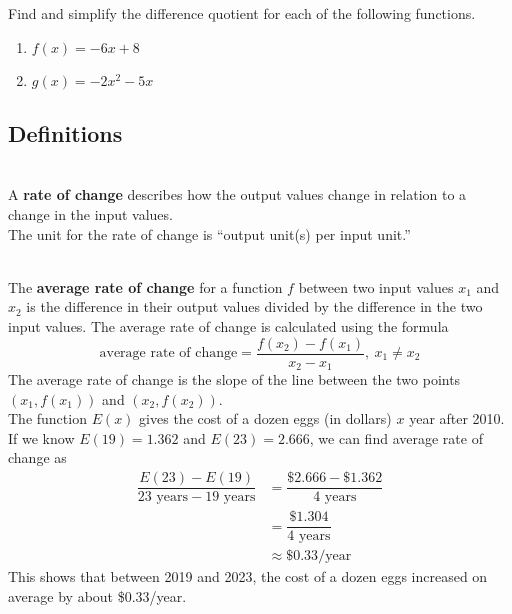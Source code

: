 



\newpage


\begin{myPractice}
Find and simplify the difference quotient for each of the following functions.
\begin{enumerate}

\item $f(x) = -6x + 8$
\vfill

\item $g(x) = -2x^2 - 5x$
\vfill


\end{enumerate}
\end{myPractice}

\newpage

\subsection*{Definitions} \label{def-difference-quotient}


\begin{myDefinition}~\\[0.5mm]
A {\bf rate of change} describes how the output values change in relation to a change in the input values.  \\
The unit for the rate of change is ``output unit(s) per input unit.''
\end{myDefinition}

\begin{myDefinition}~\\[0.5mm]
The {\bf average rate of change} for a function $f$ between two input values $x_1$ and $x_2$ is the difference in their output values divided by the difference in the two input values.  The average rate of change is calculated using the formula
\[\text{average rate of change} = \dfrac{f(x_2)-f(x_1)}{x_2-x_1}, ~ x_1 \neq x_2\]
The average rate of change is the slope of the line between the two points $(x_1, f(x_1))$ and $(x_2, f(x_2))$.\\[0.5em]
 The function $E(x)$ gives the cost of a dozen eggs (in dollars) $x$ year after 2010.  If we know $E(19) = 1.362$ and $E(23)=2.666$, we can find average rate of change as 
$$\begin{aligned}
\dfrac{E(23)-E(19)}{23\text{ years}-19\text{ years}} &= \dfrac{ \$2.666 - \$1.362 }{4 \text{ years}}\\[0.5em]
&= \dfrac{ \$1.304 }{4\text{ years}}\\[0.5em]
&\approx \$0.33/\text{year}
\end{aligned}$$
This shows that between 2019 and 2023, the cost of a dozen eggs increased on average by about \$0.33/year.
\end{myDefinition}

